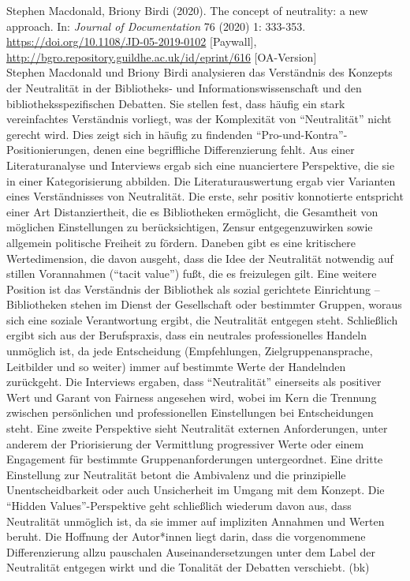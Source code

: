 \documentclass[a4paper,
fontsize=11pt,
oneside,
numbers=noperiodatend,
parskip=half-,
bibliography=totoc,
final
]{scrartcl}
\begin{document}
Stephen Macdonald, Briony Birdi (2020). The concept of neutrality: a new
approach. In: \emph{Journal of Documentation} 76 (2020) 1: 333-353.
\url{https://doi.org/10.1108/JD-05-2019-0102} {[}Paywall{]},
\url{http://bgro.repository.guildhe.ac.uk/id/eprint/616}
{[}OA-Version{]}\\
Stephen Macdonald und Briony Birdi analysieren das Verständnis des
Konzepts der Neutralität in der Bibliotheks- und
Informationswissenschaft und den bibliotheksspezifischen Debatten. Sie
stellen fest, dass häufig ein stark vereinfachtes Verständnis vorliegt,
was der Komplexität von ``Neutralität'' nicht gerecht wird. Dies zeigt
sich in häufig zu findenden ``Pro-und-Kontra''-Positionierungen, denen
eine begriffliche Differenzierung fehlt. Aus einer Literaturanalyse und
Interviews ergab sich eine nuanciertere Perspektive, die sie in einer
Kategorisierung abbilden. Die Literaturauswertung ergab vier Varianten
eines Verständnisses von Neutralität. Die erste, sehr positiv
konnotierte entspricht einer Art Distanziertheit, die es Bibliotheken
ermöglicht, die Gesamtheit von möglichen Einstellungen zu
berücksichtigen, Zensur entgegenzuwirken sowie allgemein politische
Freiheit zu fördern. Daneben gibt es eine kritischere Wertedimension,
die davon ausgeht, dass die Idee der Neutralität notwendig auf stillen
Vorannahmen (``tacit value'') fußt, die es freizulegen gilt. Eine
weitere Position ist das Verständnis der Bibliothek als sozial
gerichtete Einrichtung -- Bibliotheken stehen im Dienst der Gesellschaft
oder bestimmter Gruppen, woraus sich eine soziale Verantwortung ergibt,
die Neutralität entgegen steht. Schließlich ergibt sich aus der
Berufspraxis, dass ein neutrales professionelles Handeln unmöglich ist,
da jede Entscheidung (Empfehlungen, Zielgruppenansprache, Leitbilder und
so weiter) immer auf bestimmte Werte der Handelnden zurückgeht. Die
Interviews ergaben, dass ``Neutralität'' einerseits als positiver Wert
und Garant von Fairness angesehen wird, wobei im Kern die Trennung
zwischen persönlichen und professionellen Einstellungen bei
Entscheidungen steht. Eine zweite Perspektive sieht Neutralität externen
Anforderungen, unter anderem der Priorisierung der Vermittlung
progressiver Werte oder einem Engagement für bestimmte
Gruppenanforderungen untergeordnet. Eine dritte Einstellung zur
Neutralität betont die Ambivalenz und die prinzipielle
Unentscheidbarkeit oder auch Unsicherheit im Umgang mit dem Konzept. Die
``Hidden Values''-Perspektive geht schließlich wiederum davon aus, dass
Neutralität unmöglich ist, da sie immer auf impliziten Annahmen und
Werten beruht. Die Hoffnung der Autor*innen liegt darin, dass die
vorgenommene Differenzierung allzu pauschalen Auseinandersetzungen unter
dem Label der Neutralität entgegen wirkt und die Tonalität der Debatten
verschiebt. (bk)
\end{document}
